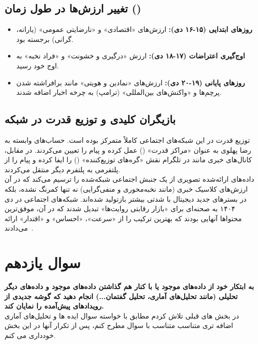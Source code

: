 \documentclass{article}
\begin{document}
	\subsection{تغییر ارزش‌ها در طول زمان ()}
	\begin{itemize}
		\item \textbf{روزهای ابتدایی (۱۵-۱۶ دی):} ارزش‌های «اقتصادی» و «نارضایتی عمومی» (یارانه، گرانی) برجسته بود.
		\item \textbf{اوج‌گیری اعتراضات (۱۷-۱۸ دی):} ارزش «درگیری و خشونت» و «فراد نخبه» به اوج خود رسید.
		\item \textbf{روزهای پایانی (۱۹-۲۰ دی):} ارزش‌های «نمادین و هویتی» مانند برافراشته شدن پرچم‌ها و «واکنش‌های بین‌المللی» (ترامپ) به چرخه اخبار اضافه شدند.
	\end{itemize}
	
	\subsection{بازیگران کلیدی و توزیع قدرت در شبکه}
	توزیع قدرت در این شبکه‌های اجتماعی کاملاً متمرکز بوده است. حساب‌های وابسته به رضا پهلوی به عنوان «مراکز قدرت» () عمل کرده و پیام را تعیین می‌کردند. در مقابل، کانال‌های خبری مانند  در تلگرام نقش «گره‌های توزیع‌کننده» () را ایفا کرده و پیام را از پلتفرمی به پلتفرم دیگر منتقل می‌کردند.
\\
	داده‌های ارائه‌شده تصویری از یک جنبش اجتماعی شبکه‌شده را ترسیم می‌کند که در آن ارزش‌های کلاسیک خبری (مانند نخبه‌محوری و منفی‌گرایی) نه تنها کمرنگ نشده، بلکه در بسترهای جدید دیجیتال با شدتی بیشتر بازتولید شده‌اند. شبکه‌های اجتماعی در دی ۱۴۰۴ به صحنه‌ای برای «بازار رقابتی روایت‌ها» تبدیل شدند که در آن، موفق‌ترین محتواها آنهایی بودند که بهترین ترکیب را از «سرعت»، «احساس» و «اقتدار» ارائه می‌دادند~\cite{chatgpt2024socialnetworkproject}.

\section{سوال یازدهم}
\textbf{به ابتکار خود از داده‌های موجود یا با کنار هم گذاشتن داده‌های موجود و داده‌های دیگر تحلیلی (مانند تحلیل‌های آماری، تحلیل گفتمان...) انجام دهید که گوشه جدیدی از رویدادهای پیش‌آمده را نمایان کند.}
\\
در بخش های قبلی تلاش کردم مطابق با خواسته سوال ایده ها و تحلیل‌های آماری اضافه تری متناسب متناسب با سوال مطرح کنم، پس از تکرار آنها در این بخش خودداری می کنم.
\begin{latin}
  	

\end{latin}
\end{document}
